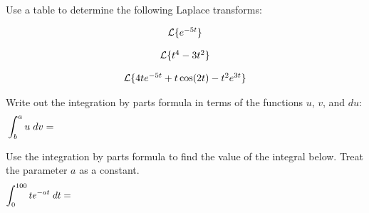 

\begin{problem}
\item Use a table to determine the following Laplace transforms:

  \begin{subproblem}
  \item 
    \begin{eqnarray*}
      \laplace{e^{-5t}}
    \end{eqnarray*}
    \vfill

  \item 
    \begin{eqnarray*}
      \laplace{t^4-3t^2}
    \end{eqnarray*}
    \vfill
      
  \item 
    \begin{eqnarray*}
      \laplace{4te^{-5t} + t\cos(2t) - t^2e^{3t}}
    \end{eqnarray*}
    \vfill

  \end{subproblem}

  \clearpage

\item Write out the integration by parts formula in terms of the
  functions $u$, $v$, and $du$:
  \begin{eqnarray*}
      \int^a_b u \; dv  = && \hspace*{30em}  \nonumber
  \end{eqnarray*}

  \vfill

\item Use the integration by parts formula to find the value of the
  integral below.  Treat the parameter $a$ as a constant.
  \begin{eqnarray*}
      \int^{100}_0 t e^{-at} \; dt  = && \hspace*{30em}  \nonumber
  \end{eqnarray*}

  \vfill

\end{problem}

